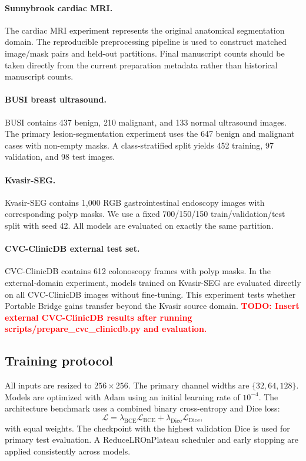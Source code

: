 \documentclass[11pt]{article}
\newcommand{\todoresult}[1]{\textcolor{red}{\textbf{TODO: #1}}}
\begin{document}
\paragraph{Sunnybrook cardiac MRI.}
The cardiac MRI experiment represents the original anatomical segmentation domain. The reproducible preprocessing pipeline is used to construct matched image/mask pairs and held-out partitions. Final manuscript counts should be taken directly from the current preparation metadata rather than historical manuscript counts.

\paragraph{BUSI breast ultrasound.}
BUSI contains 437 benign, 210 malignant, and 133 normal ultrasound images. The primary lesion-segmentation experiment uses the 647 benign and malignant cases with non-empty masks. A class-stratified split yields 452 training, 97 validation, and 98 test images.

\paragraph{Kvasir-SEG.}
Kvasir-SEG contains 1,000 RGB gastrointestinal endoscopy images with corresponding polyp masks. We use a fixed 700/150/150 train/validation/test split with seed 42. All models are evaluated on exactly the same partition.

\paragraph{CVC-ClinicDB external test set.}
CVC-ClinicDB contains 612 colonoscopy frames with polyp masks. In the external-domain experiment, models trained on Kvasir-SEG are evaluated directly on all CVC-ClinicDB images without fine-tuning. This experiment tests whether Portable Bridge gains transfer beyond the Kvasir source domain. \todoresult{Insert external CVC-ClinicDB results after running scripts/prepare\_cvc\_clinicdb.py and evaluation.}

\subsection{Training protocol}
All inputs are resized to $256\times256$. The primary channel widths are $\{32,64,128\}$. Models are optimized with Adam using an initial learning rate of $10^{-4}$. The architecture benchmark uses a combined binary cross-entropy and Dice loss:
\begin{equation}
\mathcal{L}=\lambda_{\mathrm{BCE}}\mathcal{L}_{\mathrm{BCE}}+\lambda_{\mathrm{Dice}}\mathcal{L}_{\mathrm{Dice}},
\end{equation}
with equal weights. The checkpoint with the highest validation Dice is used for primary test evaluation. A ReduceLROnPlateau scheduler and early stopping are applied consistently across models.
\end{document}
